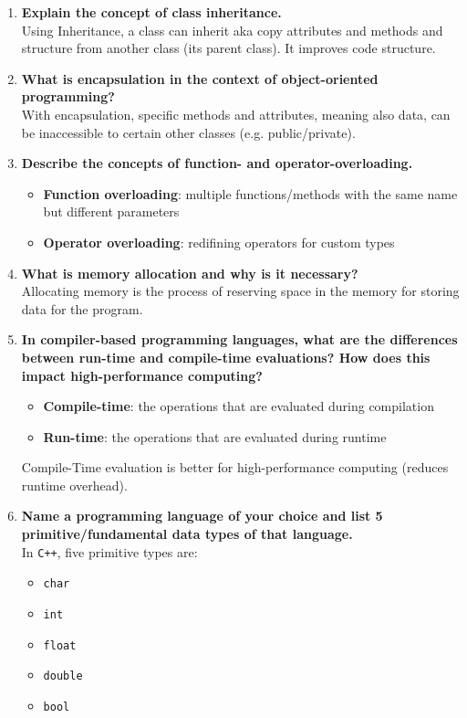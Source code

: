 \documentclass[a4paper]{article}
\begin{document}
\begin{enumerate}
    \item \textbf{Explain the concept of class inheritance.}\\
    Using Inheritance, a class can inherit aka copy attributes and methods and structure from another class (its parent class). It improves code structure.

    \item \textbf{What is encapsulation in the context of object-oriented programming?}\\
    With encapsulation, specific methods and attributes, meaning also data, can be inaccessible to certain other classes (e.g. public/private).

    \item \textbf{Describe the concepts of function- and operator-overloading.}\\
    \begin{itemize}
        \item \textbf{Function overloading}: multiple functions/methods with the same name but different parameters
        \item \textbf{Operator overloading}: redifining operators for custom types
    \end{itemize}

    \item \textbf{What is memory allocation and why is it necessary?}\\
    Allocating memory is the process of reserving space in the memory for storing data for the program.

    \item \textbf{In compiler-based programming languages, what are the differences between run-time and compile-time evaluations? How does this impact high-performance computing?}\\
    \begin{itemize}
        \item \textbf{Compile-time}: the operations that are evaluated during compilation
        \item \textbf{Run-time}: the operations that are evaluated during runtime
    \end{itemize}
    Compile-Time evaluation is better for high-performance computing (reduces runtime overhead).

    \item \textbf{Name a programming language of your choice and list 5 primitive/fundamental data types of that language.}\\
    In \texttt{C++}, five primitive types are:
    \begin{itemize}
        \item \texttt{char}
        \item \texttt{int}
        \item \texttt{float}
        \item \texttt{double}
        \item \texttt{bool}
    \end{itemize}


\end{enumerate}
\end{document}
